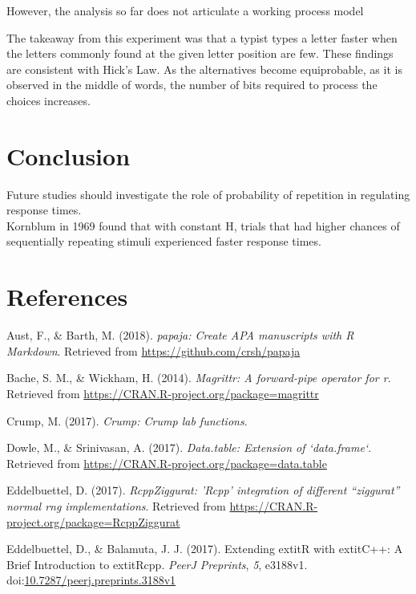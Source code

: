 \documentclass[floatsintext,man]{apa6}
\theoremstyle{definition}
\theoremstyle{definition}
\theoremstyle{definition}
\theoremstyle{remark}
\begin{document}
However, the analysis so far does not articulate a working process model

The takeaway from this experiment was that a typist types a letter
faster when the letters commonly found at the given letter position are
few. These findings are consistent with Hick's Law. As the alternatives
become equiprobable, as it is observed in the middle of words, the
number of bits required to process the choices increases.

\section{Conclusion}\label{conclusion}

Future studies should investigate the role of probability of repetition
in regulating response times.\\
Kornblum in 1969 found that with constant H, trials that had higher
chances of sequentially repeating stimuli experienced faster response
times.

\newpage

\section{References}\label{references}

\begingroup
\setlength{\parindent}{-0.5in} \setlength{\leftskip}{0.5in}

\hypertarget{refs}{}
\hypertarget{ref-R-papaja}{}
Aust, F., \& Barth, M. (2018). \emph{papaja: Create APA manuscripts with
R Markdown}. Retrieved from \url{https://github.com/crsh/papaja}

\hypertarget{ref-R-magrittr}{}
Bache, S. M., \& Wickham, H. (2014). \emph{Magrittr: A forward-pipe
operator for r}. Retrieved from
\url{https://CRAN.R-project.org/package=magrittr}

\hypertarget{ref-R-Crump}{}
Crump, M. (2017). \emph{Crump: Crump lab functions}.

\hypertarget{ref-R-data.table}{}
Dowle, M., \& Srinivasan, A. (2017). \emph{Data.table: Extension of
`data.frame`}. Retrieved from
\url{https://CRAN.R-project.org/package=data.table}

\hypertarget{ref-R-RcppZiggurat}{}
Eddelbuettel, D. (2017). \emph{RcppZiggurat: 'Rcpp' integration of
different ``ziggurat'' normal rng implementations}. Retrieved from
\url{https://CRAN.R-project.org/package=RcppZiggurat}

\hypertarget{ref-R-Rcpp_b}{}
Eddelbuettel, D., \& Balamuta, J. J. (2017). Extending extitR with
extitC++: A Brief Introduction to extitRcpp. \emph{PeerJ Preprints},
\emph{5}, e3188v1.
doi:\href{https://doi.org/10.7287/peerj.preprints.3188v1}{10.7287/peerj.preprints.3188v1}
\end{document}
